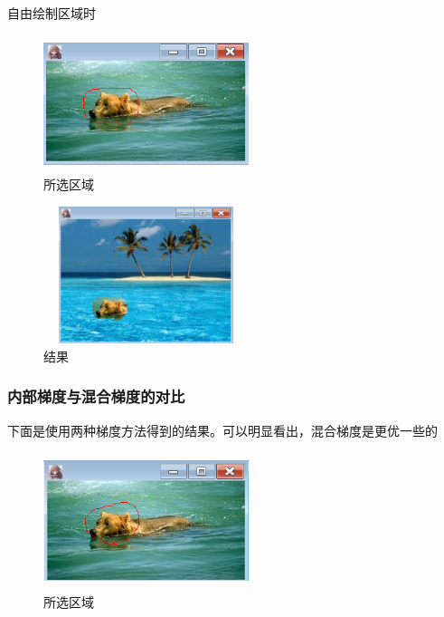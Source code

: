 \documentclass{article}
\begin{document}
  自由绘制区域时

\begin{figure}[H]
	\begin{center}
		
		\includegraphics[width=6cm,height=4cm]{free1}
		
		\caption{所选区域} \label{free1.label}
	\end{center}
\end{figure}

\begin{figure}[H]
	\begin{center}
		
		\includegraphics[width=6cm,height=4cm]{free2}
		
		\caption{结果} \label{free2.label}
	\end{center}
\end{figure}
    
        \subsubsection{内部梯度与混合梯度的对比}
        
        下面是使用两种梯度方法得到的结果。可以明显看出，混合梯度是更优一些的
        
      \begin{figure}[H]
      	\begin{center}
      		
      		\includegraphics[width=6cm,height=4cm]{duibi1}
      		
      		\caption{所选区域} \label{duibi1.label}
      	\end{center}
      \end{figure}
        
\end{document}
